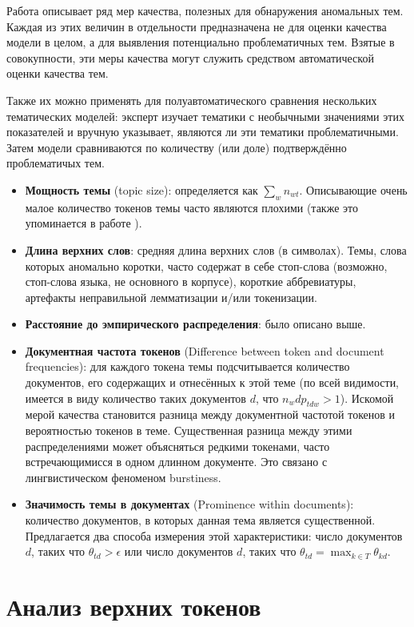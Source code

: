 Работа \cite{boydcare} описывает ряд мер качества, полезных для обнаружения аномальных тем. Каждая из этих величин в отдельности предназначена не для оценки качества модели в целом, а для выявления потенциально проблематичных тем. Взятые в совокупности, эти меры качества могут служить средством автоматической оценки качества тем. 

Также их можно применять для полуавтоматического сравнения нескольких тематических моделей: эксперт изучает тематики с необычными значениями этих показателей и вручную указывает, являются ли эти тематики проблематичными. Затем модели сравниваются по количеству (или доле) подтверждённо проблематичых тем.

\begin{itemize}
    \item \textbf{Мощность темы} (topic size): определяется как $\sum_w n_{wt}$. Описывающие очень малое количество токенов темы часто являются плохими (также это упоминается в работе \cite{mimno}).
    \item \textbf{Длина верхних слов}: средняя длина верхних слов (в символах). Темы, слова которых аномально коротки, часто содержат в себе стоп-слова (возможно, стоп-слова языка, не основного в корпусе), короткие аббревиатуры, артефакты неправильной лемматизации и/или токенизации.
    \item{\textbf{Расстояние до эмпирического распределения}: было описано выше.}
    \item{\textbf{Документная частота токенов} (Difference between token and document frequencies): для каждого токена темы подсчитывается количество документов, его содержащих и отнесённых к этой теме (по всей видимости, имеется в виду количество таких документов $d$, что $n_wd p_{tdw} > 1$).
    Искомой мерой качества становится разница между документной частотой токенов и вероятностью токенов в теме. Существенная разница между этими распределениями может объясняться редкими токенами, часто встречающимисся в одном длинном документе. Это связано с лингвистическом феноменом burstiness.}
    \item{\textbf{Значимость темы в документах} (Prominence within documents): количество документов, в которых данная тема является существенной. Предлагается два способа измерения этой характеристики: число документов $d$, таких что $\theta_{td} > \epsilon$ или число документов $d$, таких что $\theta_{td} = \max_{k \in T} \theta_{kd}$.}
\end{itemize}

\section{Анализ верхних токенов}
\label{sec:toptokens}

